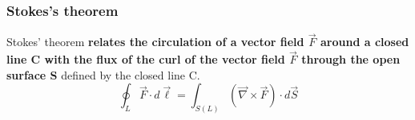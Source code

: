 \documentclass[english,11pt]{article}
\begin{document}
\subsubsection*{\bf Stokes's theorem}
Stokes' theorem {\bf relates
the circulation of a vector field $\vec{F}$ around a closed line C
with the flux of the curl of the vector field $\vec{F}$ through the open surface S} defined by the closed line C.\\
\begin{equation*}
  \oint_{L} \vec{F} \cdot d\vec{\ell} = \int_{S(L)} (\vec{\nabla} \times \vec{F}) \cdot d\vec{S}
\end{equation*}
\end{document}

